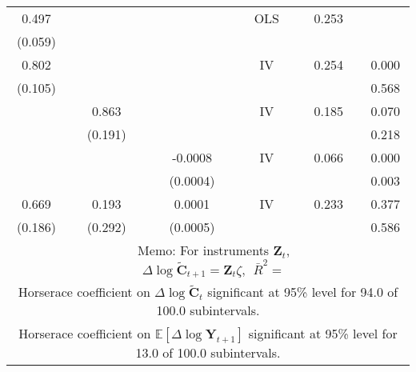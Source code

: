 \begin{table}
\begin{tabular}{cccccc}
\\ 0.497 & & & OLS & 0.253& 
\\ (0.059) & & & & & 
\\  0.802 & & & IV & 0.254 & 0.000
\\  (0.105) & & & & & 0.568
\\ & 0.863 & & IV & 0.185 & 0.070
\\ & (0.191) & & & & 0.218
\\ & & -0.0008 & IV & 0.066 & 0.000
\\ & & (0.0004) & & & 0.003
\\ 0.669 & 0.193 & 0.0001 & IV & 0.233 & 0.377
\\ (0.186) & (0.292) & (0.0005) & & & 0.586
\\ & \multicolumn{4}{c}{Memo: For instruments $\mathbf{Z}_{t}$,  $\Delta \log \widetilde{\mathbf{C}}_{t+1} = \mathbf{Z}_{t} \zeta,~~\bar{R}^{2}=$ } 0.254 & 
\\ \multicolumn{6}{c}{Horserace coefficient on $\Delta \log \widetilde{\mathbf{C}}_t$ significant at 95\% level for 94.0 of 100.0 subintervals.} 
\\ \multicolumn{6}{c}{Horserace coefficient on $\mathbb{E}[\Delta \log \mathbf{Y}_{t+1}]$ significant at 95\% level for 13.0 of 100.0 subintervals.} 
\\ \hline \hline 
\end{tabular} 
\end{table} 
